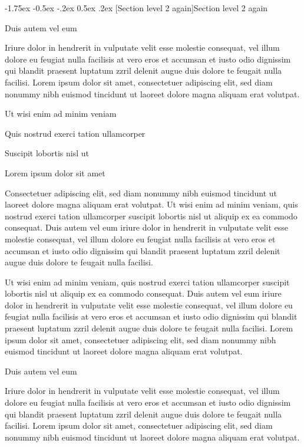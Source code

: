 \documentclass[11pt,twoside]{article}\makeatletter
\makeatletter
\renewcommand\section{\@startsection {section}{1}{\z@}%
     {-1.75ex \@plus -0.5ex \@minus -.2ex}%
     {0.5ex \@plus .2ex}%
     {\reset@font\Large\bfseries\sffamily}}
\makeatother
\begin{document}
\section[{Section level 2 again}]{Section level 2 again}\par
Duis autem vel eum \par
Iriure dolor in hendrerit in vulputate velit esse molestie consequat, vel illum dolore eu feugiat nulla facilisis at vero eros et accumsan et iusto odio dignissim qui blandit praesent luptatum zzril delenit augue duis dolore te feugait nulla facilisi. Lorem ipsum dolor sit amet, consectetuer adipiscing elit, sed diam nonummy nibh euismod tincidunt ut laoreet dolore magna aliquam erat volutpat. \par
Ut wisi enim ad minim veniam\par
Quis nostrud exerci tation ullamcorper \par
Suscipit lobortis nisl ut \par
Lorem ipsum dolor sit amet\par
Consectetuer adipiscing elit, sed diam nonummy nibh euismod tincidunt ut laoreet dolore magna aliquam erat volutpat. Ut wisi enim ad minim veniam, quis nostrud exerci tation ullamcorper suscipit lobortis nisl ut aliquip ex ea commodo consequat. Duis autem vel eum iriure dolor in hendrerit in vulputate velit esse molestie consequat, vel illum dolore eu feugiat nulla facilisis at vero eros et accumsan et iusto odio dignissim qui blandit praesent luptatum zzril delenit augue duis dolore te feugait nulla facilisi.\par
Ut wisi enim ad minim veniam, quis nostrud exerci tation ullamcorper suscipit lobortis nisl ut aliquip ex ea commodo consequat. Duis autem vel eum iriure dolor in hendrerit in vulputate velit esse molestie consequat, vel illum dolore eu feugiat nulla facilisis at vero eros et accumsan et iusto odio dignissim qui blandit praesent luptatum zzril delenit augue duis dolore te feugait nulla facilisi. Lorem ipsum dolor sit amet, consectetuer adipiscing elit, sed diam nonummy nibh euismod tincidunt ut laoreet dolore magna aliquam erat volutpat. \par
Duis autem vel eum \par
Iriure dolor in hendrerit in vulputate velit esse molestie consequat, vel illum dolore eu feugiat nulla facilisis at vero eros et accumsan et iusto odio dignissim qui blandit praesent luptatum zzril delenit augue duis dolore te feugait nulla facilisi. Lorem ipsum dolor sit amet, consectetuer adipiscing elit, sed diam nonummy nibh euismod tincidunt ut laoreet dolore magna aliquam erat volutpat. \par
\end{document}
